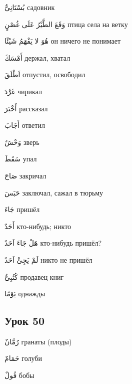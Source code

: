 \documentclass[a5paper]{article}
\newcommand\textstyleDropCaps[1]{#1}
\newcommand\textstyleCaptioncharacters[1]{#1}
\begin{document}
\textstyleCaptioncharacters{بُسْتَانِىٌّ }\textstyleDropCaps{садовник‎}

\textstyleCaptioncharacters{وَقَعَ الطَّيْرُ عَلَى غُصْنٍ }\textstyleDropCaps{птица села на ветку‎}

\textstyleCaptioncharacters{هُوَ لا يَفْهَمُ شَيْئًا }\textstyleDropCaps{он ничего не понимает‎}

\textstyleCaptioncharacters{أَمْسَكَ }\textstyleDropCaps{держал, хватал‎}

\textstyleCaptioncharacters{اَطْلَقَ }\textstyleDropCaps{отпустил, освобо­дил‎}

\textstyleCaptioncharacters{غَرَّدَ }\textstyleDropCaps{чирикал‎}

\textstyleCaptioncharacters{أَخْبَرَ }\textstyleDropCaps{рассказал‎}

\textstyleCaptioncharacters{أَجَابَ }\textstyleDropCaps{ответил‎}

\textstyleCaptioncharacters{وَحْشٌ }\textstyleDropCaps{зверь‎}

\textstyleCaptioncharacters{سَقَطَ }\textstyleDropCaps{упал‎}

\textstyleCaptioncharacters{صَاحَ }\textstyleDropCaps{закричал‎}

\textstyleCaptioncharacters{حَبَسَ }\textstyleDropCaps{заключал, сажал в тюрьму‎}

\textstyleCaptioncharacters{جَاءَ }\textstyleDropCaps{пришёл‎}

\textstyleCaptioncharacters{أَحَدٌ }\textstyleDropCaps{кто-нибудь; никто‎}

\textstyleCaptioncharacters{هَلْ جَاءَ اَحَدٌ }\textstyleDropCaps{кто-нибудь пришёл?‎}

\textstyleCaptioncharacters{لَمْ يَجِئْ اَحَدٌ }\textstyleDropCaps{никто не пришёл‎}

\textstyleCaptioncharacters{كُتُبِىٌّ }\textstyleDropCaps{продавец книг‎}

\textstyleCaptioncharacters{يَوْمًا }\textstyleDropCaps{однажды‎}

\subsection[Урок 50‎]{\textstyleDropCaps{Урок 50‎}}
\textstyleCaptioncharacters{رُمَّانٌ }\textstyleDropCaps{гранаты (плоды)‎}

\textstyleCaptioncharacters{حَمَامٌ }\textstyleDropCaps{голуби‎}

\textstyleCaptioncharacters{فُولٌ }\textstyleDropCaps{бобы‎}
\end{document}

